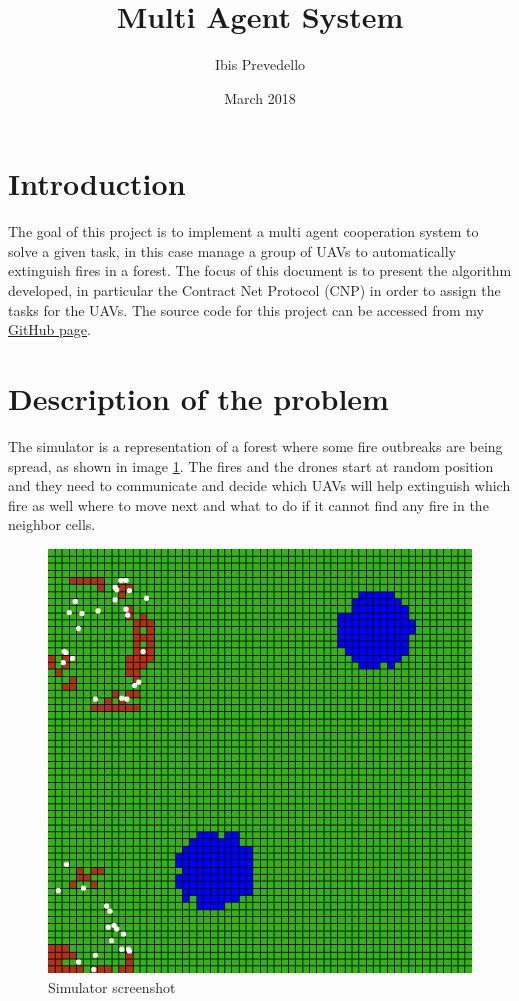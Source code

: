 \documentclass{article}
\title{Multi Agent System}
\date{March 2018}
\author{Ibis Prevedello}
\begin{document}
\maketitle

\section{Introduction}
The goal of this project is to implement a multi agent cooperation system to solve a given task, in this case manage a group of UAVs to automatically extinguish fires in a forest. The focus of this document is to present the algorithm developed, in particular the Contract Net Protocol (CNP) in order to assign the tasks for the UAVs. The source code for this project can be accessed from my \href{https://github.com/ibiscp/Fire-Extinguishers-Drones}{GitHub page}.

\section{Description of the problem}
The simulator is a representation of a forest where some fire outbreaks are being spread, as shown in image \ref{fig:fig1}. The fires and the drones start at random position and they need to communicate and decide which UAVs will help extinguish which fire as well where to move next and what to do if it cannot find any fire in the neighbor cells.

\begin{figure}[!ht]
\centering
\includegraphics[scale=0.30]{environment}
\caption{Simulator screenshot}
\label{fig:fig1}
\end{figure}
\end{document}
